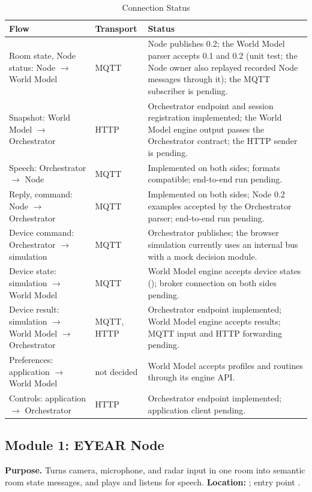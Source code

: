 \documentclass[conference]{IEEEtran}
\newcommand{\fld}[1]{\texttt{\detokenize{#1}}}
\begin{document}
\begin{table}[!t]
\caption{Connection Status}
\label{tab:integration}
\centering
\footnotesize
\begin{tabularx}{\textwidth}{@{}L{0.24\textwidth}L{0.24\textwidth}Y@{}}
\toprule
\textbf{Flow} & \textbf{Transport} & \textbf{Status} \\
\midrule
Room state, Node status: Node $\to$ World Model & MQTT & Node publishes 0.2; the World Model parser accepts 0.1 and 0.2 (unit test; the Node owner also replayed recorded Node messages through it); the MQTT subscriber is pending. \\
Snapshot: World Model $\to$ Orchestrator & HTTP & Orchestrator endpoint and session registration implemented; the World Model engine output passes the Orchestrator contract; the HTTP sender is pending. \\
Speech: Orchestrator $\to$ Node & MQTT & Implemented on both sides; formats compatible; end-to-end run pending. \\
Reply, command: Node $\to$ Orchestrator & MQTT & Implemented on both sides; Node 0.2 examples accepted by the Orchestrator parser; end-to-end run pending. \\
Device command: Orchestrator $\to$ simulation & MQTT & Orchestrator publishes; the browser simulation currently uses an internal bus with a mock decision module. \\
Device state: simulation $\to$ World Model & MQTT & World Model engine accepts device states (\fld{upsert_device}); broker connection on both sides pending. \\
Device result: simulation $\to$ World Model $\to$ Orchestrator & MQTT, HTTP & Orchestrator endpoint implemented; World Model engine accepts results; MQTT input and HTTP forwarding pending. \\
Preferences: application $\to$ World Model & not decided & World Model accepts profiles and routines through its engine API. \\
Controls: application $\to$ Orchestrator & HTTP & Orchestrator endpoint implemented; application client pending. \\
\bottomrule
\end{tabularx}
\end{table}

\subsection{Module 1: EYEAR Node}

\textbf{Purpose.} Turns camera, microphone, and radar input in one
room into semantic room state messages, and plays and listens for
speech. \textbf{Location:} \fld{eyear-node}; entry point \fld{main.py}.
\end{document}
